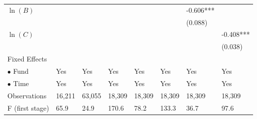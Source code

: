 \documentclass[openany]{book}
\theoremstyle{definition}
\theoremstyle{definition}
\theoremstyle{definition}
\theoremstyle{remark}
\begin{document}
\begin{table}[ht]
\begin{tabularx}{0.975\textwidth}{lYYYYYYY}
  $\ln(B)$ &  &  &  &  &  & -0.606*** &  \\ 
   &  &  &  &  &  & (0.088) &  \\ 
  $\ln(C)$ &  &  &  &  &  &  & -0.408*** \\ 
   &  &  &  &  &  &  & (0.038) \\ 
  Fixed Effects &  &  &  &  &  &  &  \\ 
  $\bullet$ Fund & Yes & Yes & Yes & Yes & Yes & Yes & Yes \\ 
  $\bullet$ Time & Yes & Yes & Yes & Yes & Yes & Yes & Yes \\ 
  Observations & 16,211 & 63,055 & 18,309 & 18,309 & 18,309 & 18,309 & 18,309 \\ 
  F (first stage) & 65.9 & 24.9 & 170.6 & 78.2 & 133.3 & 36.7 & 97.6 \\ 
   \bottomrule
\end{tabularx}
\endgroup
\end{table}
\end{document}
